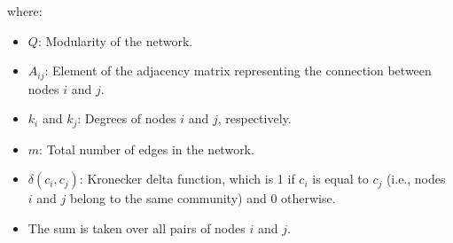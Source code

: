 where:

\begin{itemize}
  \setlength\itemsep{0.4em} %
  \item \(Q\): Modularity of the network.
  \item \(A_{ij}\): Element of the adjacency matrix representing the connection between nodes \(i\) and \(j\).
  \item \(k_i\) and \(k_j\): Degrees of nodes \(i\) and \(j\), respectively.
  \item \(m\): Total number of edges in the network.
  \item \(\delta(c_i, c_j)\): Kronecker delta function, which is 1 if \(c_i\) is equal to \(c_j\) (i.e., nodes \(i\)
        and \(j\) belong to the same community) and 0 otherwise.
  \item The sum is taken over all pairs of nodes \(i\) and \(j\).
\end{itemize}






